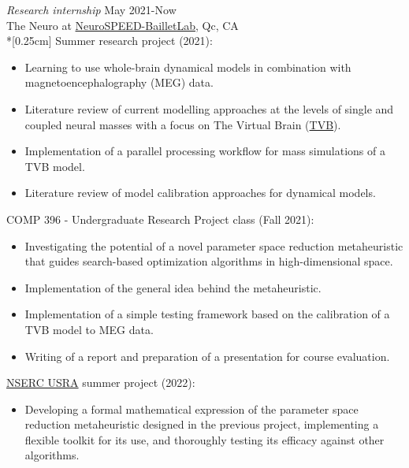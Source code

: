 \documentclass[margin, 10pt]{res} %
\begin{document}
\begin{resume}
		{\sl Research internship} \hfill May 2021-Now\\The Neuro at \href{https://www.neurospeed-bailletlab.org/}{NeuroSPEED-BailletLab}, Qc, CA\\*[0.25cm] 
		Summer research project (2021):
		\vspace*{0.15cm}
		\begin{itemize} \itemsep -2pt %
			\item[\ding{227}] Learning to use whole-brain dynamical models in combination with magnetoencephalography (MEG) data.
			\item Literature review of current modelling approaches at the levels of single and coupled neural masses with a focus on The Virtual Brain (\href{https://www.thevirtualbrain.org/tvb/zwei}{TVB}).
			\item Implementation of a parallel processing workflow for mass simulations of a TVB model.
			\item Literature review of model calibration approaches for dynamical models.
		\end{itemize}
		\vspace{-0.10cm}
		COMP 396 - Undergraduate Research Project class (Fall 2021):
		\vspace*{0.15cm}
		\begin{itemize} \itemsep -2pt %
			\item[\ding{227}] Investigating the potential of a novel parameter space reduction metaheuristic that guides search-based optimization algorithms in high-dimensional space.
			\item Implementation of the general idea behind the metaheuristic.
			\item Implementation of a simple testing framework based on the calibration of a TVB model to MEG data.
			\item Writing of a report and preparation of a presentation for course evaluation.
		\end{itemize}
		\vspace{-0.10cm}
		\href{https://www.nserc-crsng.gc.ca/students-etudiants/ug-pc/usra-brpc_eng.asp}{NSERC USRA} summer project (2022):
		\vspace*{0.15cm}
		\begin{itemize} \itemsep -2pt %
			\item[\ding{227}] Developing a formal mathematical expression of the parameter space reduction metaheuristic designed in the previous project, implementing a flexible toolkit for its use, and thoroughly testing its efficacy against other algorithms.

\end{itemize}
\end{resume}
\end{document}
